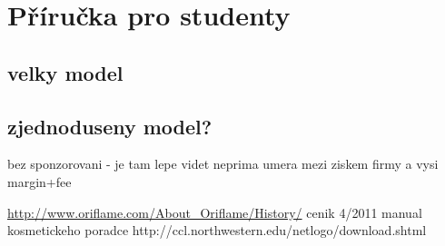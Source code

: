 \documentclass[a4wide,12pt]{report}
\begin{document}
\chapter*{Příručka pro studenty}
\section{velky model}
\section{zjednoduseny model?}
bez sponzorovani - je tam lepe videt neprima umera mezi ziskem firmy a vysi margin+fee
\begin{thebibliography}{9}


\end{thebibliography}
\url{http://www.oriflame.com/About_Oriflame/History/}
cenik 4/2011
manual kosmetickeho poradce
http://ccl.northwestern.edu/netlogo/download.shtml
\end{document}
